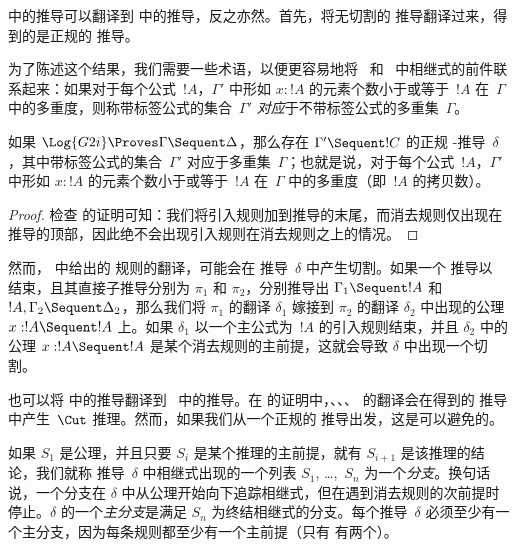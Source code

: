 \documentclass[../../../include/open-logic-section]{subfiles}
\begin{document}


 中的推导可以翻译到  中的推导，反之亦然。首先，将无切割的
 推导翻译过来，得到的是正规的  推导。

为了陈述这个结果，我们需要一些术语，以便更容易地将~ 和~ 中相继式的前件联系起来：如果对于每个公式~$!A$，$\Gamma'$ 中形如 $x : !A$ 的元素个数小于或等于~$!A$ 在~$\Gamma$ 中的多重度，则称带标签公式的集合~$\Gamma'$ \emph{对应}于不带标签公式的多重集~$\Gamma$。

\begin{cor}
如果 $\Log{G2i} \Proves \Gamma \Sequent \Delta$，那么存在 $\Gamma' \Sequent !C$ 的正规
-推导~$\delta$，其中带标签公式的集合~$\Gamma'$ 对应于多重集~$\Gamma$；也就是说，对于每个公式~$!A$，$\Gamma'$ 中形如 $x : !A$ 的元素个数小于或等于~$!A$ 在~$\Gamma$ 中的多重度（即~$!A$ 的拷贝数）。
\end{cor}

\begin{proof}
检查  的证明可知：我们将引入规则加到推导的末尾，而消去规则仅出现在推导的顶部，因此绝不会出现引入规则在消去规则之上的情况。
\end{proof}

然而， 中给出的 \Cut{} 规则的翻译，可能会在
 推导~$\delta$ 中产生切割。如果一个  推导以~\Cut{} 结束，且其直接子推导分别为 $\pi_1$ 和 $\pi_2$，分别推导出 $\Gamma_1
\Sequent !A$ 和 $!A, \Gamma_2 \Sequent \Delta_2$，那么我们将 $\pi_1$ 的翻译 $\delta_1$ 嫁接到 $\pi_2$ 的翻译 $\delta_2$ 中出现的公理 $x:!A
\Sequent !A$ 上。如果 $\delta_1$ 以一个主公式为~$!A$ 的引入规则结束，并且 $\delta_2$ 中的公理 $x:!A \Sequent !A$ 是某个消去规则的主前提，这就会导致 $\delta$ 中出现一个切割。

也可以将  中的推导翻译到~ 中的推导。在  的证明中，\Elim{\land}、\Elim{\lif}、\Elim{\lnot}、
\Elim{\lforall} 的翻译会在得到的  推导中产生~$\Cut$ 推理。然而，如果我们从一个正规的  推导出发，这是可以避免的。

如果 $S_1$ 是公理，并且只要 $S_i$ 是某个推理的主前提，就有 $S_{i+1}$ 是该推理的结论，我们就称  推导~$\delta$ 中相继式出现的一个列表 $S_1$, \dots,~$S_n$ 为一个\emph{分支}。换句话说，一个分支在 $\delta$ 中从公理开始向下追踪相继式，但在遇到消去规则的次前提时停止。$\delta$ 的一个\emph{主分支}是满足 $S_n$ 为终结相继式的分支。每个推导~$\delta$ 必须至少有一个主分支，因为每条规则都至少有一个主前提（只有 \Intro{\land} 有两个）。
\end{document}

